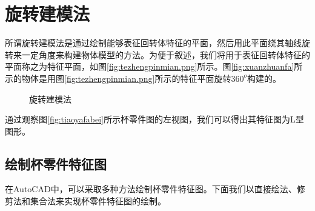 \section{旋转建模法}
所谓旋转建模法是通过绘制能够表征回转体特征的平面，然后用此平面绕其轴线旋转来一定角度来构建物体模型的方法。为便于叙述，我们将用于表征回转体特征的平面称之为特征平面，如图\ref{fig:tezhengpinmian.png}所示。图\ref{fig:xuanzhuanfa}所示的物体是用图\ref{fig:tezhengpinmian.png}所示的特征平面旋转$360^o$构建的。
\begin{figure}[htbp]
\hspace{60pt}
\caption{旋转建模法}
\end{figure}
通过观察图\ref{fig:tiaoyafabei}所示杯零件图的左视图，我们可以得出其特征图为L型图形。
\subsection{绘制杯零件特征图}\label{sec:beilingjiantezheng}
在AutoCAD中，可以采取多种方法绘制杯零件特征图。下面我们以直接绘法、修剪法和集合法来实现杯零件特征图的绘制。
